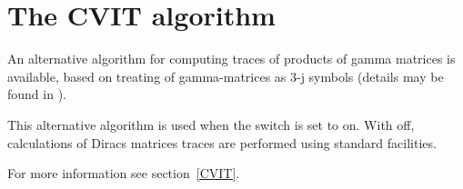 \section{The CVIT algorithm}
\hypertarget{switch:CVIT}{}

An alternative algorithm for computing traces of products of gamma matrices is available,
based on treating of gamma-matrices as 3-j symbols (details may be found in
\cite{Ilyin:89,Kennedy:1982}).

This alternative algorithm is used when the switch  is set to on. With  off,
calculations of Diracs matrices traces are performed using standard \REDUCE{} facilities.

For more information see section~\ref{CVIT}.
\endinput

